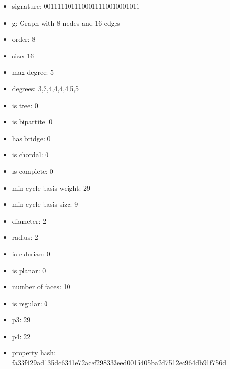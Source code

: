 \begin{itemize}
\item signature: 0011111011100011110010001011
\item g: Graph with 8 nodes and 16 edges
\item order: 8
\item size: 16
\item max degree: 5
\item degrees: 3,3,4,4,4,4,5,5
\item is tree: 0
\item is bipartite: 0
\item has bridge: 0
\item is chordal: 0
\item is complete: 0
\item min cycle basis weight: 29
\item min cycle basis size: 9
\item diameter: 2
\item radius: 2
\item is eulerian: 0
\item is planar: 0
\item number of faces: 10
\item is regular: 0
\item p3: 29
\item p4: 22
\item property hash: fa33f429ad135dc6341e72acef298333eed0015405ba2d7512ec964db91f756d
\end{itemize}
\newpage
\begin{figure}
\end{figure}
